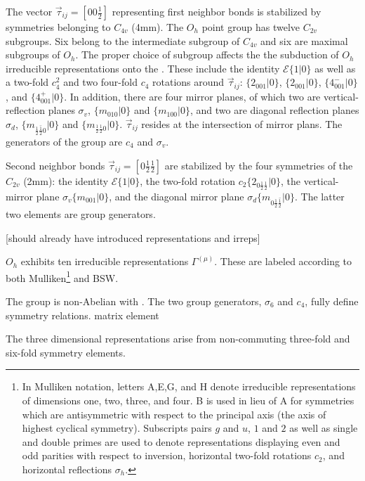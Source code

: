 \documentclass[twocolumn,showpacs,preprintnumbers,superscriptaddress,prb,floatfix,aps,10pt]{revtex4-1}
\newcommand*{\id}{\mathcal{E}}
\newcommand*{\bondvec}{\vec{\tau}_{ij}}
\newcommand{\seitz}[2]{\{#1|#2\}}
\begin{document}
The vector $\bondvec = [00\frac{1}{2}]$ representing first neighbor bonds is stabilized by symmetries belonging to $C_{4v}$ (4mm). The $O_h$ point group has twelve $C_{2v}$ subgroups. Six belong to the intermediate subgroup of $C_{4v}$ and six are maximal subgroups of $O_h$.\cite{wadhawan_introduction_2000} The proper choice of subgroup affects the the subduction of $O_h$ irreducible representations onto the . 
These include the identity $\id \seitz{1}{0}$ as well as a two-fold $c_{4}^2$ and two four-fold $c_{4}$ rotations around $\bondvec$: $\seitz{2_{001}}{0}$, $\seitz{2_{001}}{0}$, $\seitz{4^-_{001}}{0}$, and $\seitz{4^+_{001}}{0}$. In addition, there are four mirror planes, of which two are vertical-reflection planes $\sigma_v$, $\seitz{m_{010}}{0}$ and $\seitz{m_{100}}{0}$, 
and two are diagonal reflection planes $\sigma_d$, $\seitz{m_{\frac{1}{2}\bar{\frac{1}{2}}0}}{0}$ and $\seitz{m_{\frac{1}{2}\frac{1}{2}0}}{0}$. $\bondvec$ resides at the intersection of mirror plans. The generators of the group are $c_4$ and $\sigma_v$.

Second neighbor bonds $\bondvec = [0\frac{1}{2}\frac{1}{2}]$ are stabilized by the four symmetries of the $C_{2v}$ (2mm): the identity $\id \seitz{1}{0}$, the two-fold rotation $c_2 \seitz{ 2_{0\frac{1}{2}\frac{1}{2}} }{0}$, the vertical-mirror plane $\sigma_v \seitz{m_{001}}{0}$, and the diagonal mirror plane $\sigma_d \seitz{m_{0\frac{1}{2}\bar{\frac{1}{2}}}}{0}$. The latter two elements are group generators.

[should already have introduced representations and irreps]

$O_h$ exhibits ten irreducible representations $\Gamma^{(\mu)}$. These are labeled according to both Mulliken\footnote{In Mulliken notation, letters A,E,G, and H denote irreducible representations of dimensions one, two, three, and four. B is used in lieu of A for symmetries which are antisymmetric with respect to the principal axis (the axis of highest cyclical symmetry). Subscripts pairs $g$ and $u$, $1$ and $2$ as well as single and double primes are used to denote representations displaying even and odd parities with respect to inversion, horizontal two-fold rotations $c_2$, and horizontal reflections $\sigma_h$.} and BSW.


The group is non-Abelian with . The two group generators, $\sigma_6$ and $c_4$, fully define symmetry relations.
matrix element 


The three dimensional representations arise from non-commuting three-fold and six-fold symmetry elements. 
\end{document}
